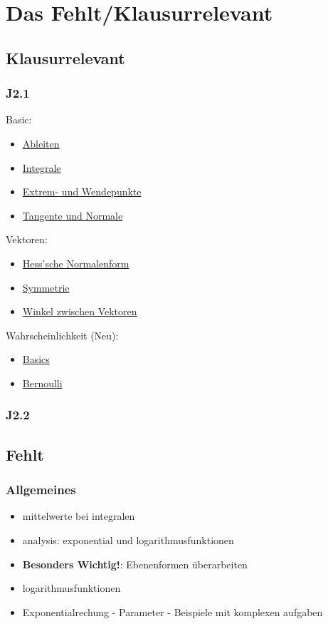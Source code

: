 \chapter{Das Fehlt/Klausurrelevant}

\section{Klausurrelevant}
\subsection{J2.1}
Basic:
\begin{multicols}{2}
    \begin{itemize}
        \item \hyperref[sec:ableiten]{Ableiten}
        \item \hyperref[sec:integrale]{Integrale} 
        \item \hyperref[sec:extremundwendepunkte]{Extrem- und Wendepunkte}
        \item \hyperref[sec:tangenteundnormale]{Tangente und Normale}
    \end{itemize}
\end{multicols}

Vektoren:
\begin{itemize}
    \item \hyperref[sec:hessscheform]{Hess'sche Normalenform}
    \item \hyperref[sec:symmetrie]{Symmetrie}
    \item \hyperref[sec:winkel_vektoren]{Winkel zwischen Vektoren}
\end{itemize}

Wahrscheinlichkeit (Neu):
\begin{itemize}
    \item \hyperref[sec:elemkombinatorik]{Basics}
    \item \hyperref[sec:bernoulli]{Bernoulli}
\end{itemize}

\subsection{J2.2}

\secspacehuge

\section{Fehlt}
\subsection{Allgemeines}
\begin{itemize}
    \item mittelwerte bei integralen
    \item analysis: exponential und logarithmusfunktionen
    \item \textbf{Besonders Wichtig!}: Ebenenformen überarbeiten 
    \item logarithmusfunktionen
    \item Exponentialrechung - Parameter - Beispiele mit komplexen aufgaben
\end{itemize}

